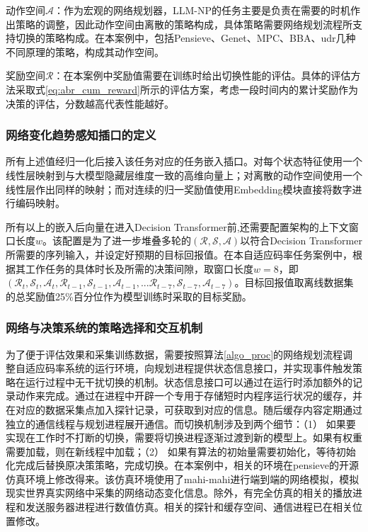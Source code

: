 动作空间$\mathcal{A}$：作为宏观的网络规划器，LLM-NP的任务主要是负责在需要的时机作出策略的调整，因此动作空间由离散的策略构成，具体策略需要网络规划流程所支持切换的策略构成。在本案例中，包括Pensieve、Genet、MPC、BBA、udr几种不同原理的策略，构成其动作空间。

奖励空间$\mathcal{R}$：在本案例中奖励值需要在训练时给出切换性能的评估。具体的评估方法采取式\eqref{eq:abr_cum_reward}所示的评估方案，考虑一段时间内的累计奖励作为决策的评估，分数越高代表性能越好。

\subsubsection{网络变化趋势感知插口的定义}
所有上述值经归一化后接入该任务对应的任务嵌入插口。对每个状态特征使用一个线性层映射到与大模型隐藏层维度一致的高维向量上；对离散的动作空间使用一个线性层作出同样的映射；而对连续的归一奖励值使用Embedding模块直接将数字进行编码映射。

所有以上的嵌入后向量在进入Decision Transformer前,还需要配置架构的上下文窗口长度$w$。该配置是为了进一步堆叠多轮的$(\mathcal{R},\mathcal{S},\mathcal{A})$以符合Decision Transformer所需要的序列输入，并设定好预期的目标回报值。在本自适应码率任务案例中，根据其工作任务的具体时长及所需的决策间隙，取窗口长度$w = 8$，即$(\mathcal{R}_t,\mathcal{S}_t,\mathcal{A}_t,\mathcal{R}_{t-1},\mathcal{S}_{t-1},\mathcal{A}_{t-1},...\mathcal{R}_{t-7},\mathcal{S}_{t-7},\mathcal{A}_{t-7})$。目标回报值取离线数据集的总奖励值25\%百分位作为模型训练时采取的目标奖励。


\subsubsection{网络与决策系统的策略选择和交互机制}
为了便于评估效果和采集训练数据，需要按照算法\ref{algo_proc}的网络规划流程调整自适应码率系统的运行环境，向规划进程提供状态信息接口，并实现事件触发策略在运行过程中无干扰切换的机制。状态信息接口可以通过在运行时添加额外的记录动作来完成。通过在进程中开辟一个专用于存储短时内程序运行状况的缓存，并在对应的数据采集点加入探针记录，可获取到对应的信息。随后缓存内容定期通过独立的通信线程与规划进程展开通信。而切换机制涉及到两个细节：（1） 如果要实现在工作时不打断的切换，需要将切换进程逐渐过渡到新的模型上。如果有权重需要加载，则在新线程中加载；（2） 如果有算法的初始量需要初始化，等待初始化完成后替换原决策策略，完成切换。在本案例中，相关的环境在pensieve的开源仿真环境上修改得来。该仿真环境使用了mahi-mahi进行端到端的网络模拟，模拟现实世界真实网络中采集的网络动态变化信息。除外，有完全仿真的相关的播放进程和发送服务器进程进行数值仿真。相关的探针和缓存空间、通信进程已在相关位置修改。

